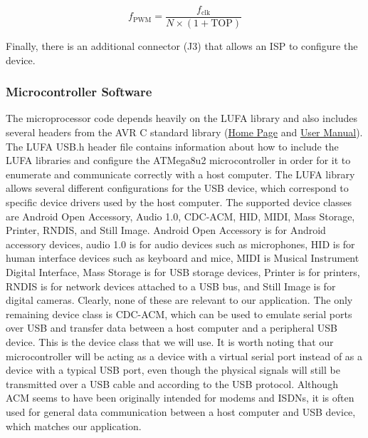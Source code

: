 \documentclass[11pt,twoside,a4paper]{report}
\begin{document}
\begin{equation}
  f_{\text{PWM}} = \frac{f_{\text{clk}}}{N \times (1 + \text{TOP})}
  \label{eq:pwm-freq}
\end{equation}

Finally, there is an additional connector (J3) that allows an ISP to configure the device.


\subsubsection{Microcontroller Software}
The microprocessor code depends heavily on the LUFA library and also includes several headers from
the AVR C standard library (\href{http://www.nongnu.org/avr-libc/}{Home Page} and
\href{http://www.nongnu.org/avr-libc/user-manual/index.html}{User Manual}). The LUFA USB.h header
file contains information about how to include the LUFA libraries and configure the ATMega8u2
microcontroller in order for it to enumerate and communicate correctly with a host computer. The
LUFA library allows several different configurations for the USB device, which correspond to
specific device drivers used by the host computer. The supported device classes are Android Open
Accessory, Audio 1.0, CDC-ACM, HID, MIDI, Mass Storage, Printer, RNDIS, and Still Image. Android
Open Accessory is for Android accessory devices, audio 1.0 is for audio devices such as microphones,
HID is for human interface devices such as keyboard and mice, MIDI is Musical Instrument Digital
Interface, Mass Storage is for USB storage devices, Printer is for printers, RNDIS is for network
devices attached to a USB bus, and Still Image is for digital cameras. Clearly, none of these are
relevant to our application. The only remaining device class is CDC-ACM, which can be used to
emulate serial ports over USB and transfer data between a host computer and a peripheral USB
device. This is the device class that we will use. It is worth noting that our microcontroller will
be acting as a device with a virtual serial port instead of as a device with a typical USB port,
even though the physical signals will still be transmitted over a USB cable and according to the USB
protocol. Although ACM seems to have been originally intended for modems and ISDNs, it is often used
for general data communication between a host computer and USB device, which matches our
application.\newline
\end{document}
